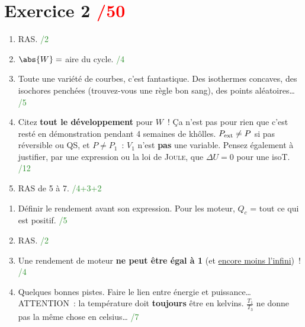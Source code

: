 \documentclass[a4paper, 11pt, final, garamond]{book}
\begin{document}
\section{Exercice 2 \hfill \textcolor{red}{/50}}
\begin{enumerate}
	\item RAS.
	      \hfill \textcolor{ForestGreen}{/2}
	\item $\abs{W} =$ aire du cycle.
	      \hfill \textcolor{ForestGreen}{/4}
	\item Toute une variété de courbes, c'est fantastique. Des isothermes
	      concaves, des isochores penchées (trouvez-vous une règle bon sang), des
	      points aléatoires…
	      \hfill \textcolor{ForestGreen}{/5}
	\item Citez \textbf{tout le développement} pour $W$~! Ça n'est pas pour rien
	      que c'est resté en démonstration pendant 4 semaines de khôlles. $P_{\rm ext}
		      \neq P$ si pas réversible ou QS, et $P \neq P_1$~: $V_1$ n'est \textbf{pas}
	      une variable. Pensez également à justifier, par une expression ou la loi de
	      \textsc{Joule}, que $\Delta{U} = 0$ pour une isoT.
	      \hfill \textcolor{ForestGreen}{/12}
	\item RAS de 5 à 7.
	      \hfill \textcolor{ForestGreen}{/4+3+2}
\end{enumerate}
\begin{enumerate}[start=8]
	\item Définir le rendement avant son expression. Pour les moteur, $Q_c$ = tout
	      ce qui est positif.
	      \hfill \textcolor{ForestGreen}{/5}
	\item RAS.
	      \hfill \textcolor{ForestGreen}{/2}
	\item Une rendement de moteur \textbf{ne peut être égal à 1} (et \ul{encore
		      moins l'infini})~!
	      \hfill \textcolor{ForestGreen}{/4}
	\item Quelques bonnes pistes. Faire le lien entre énergie et puissance…
	      ATTENTION~: la température doit \textbf{toujours} être en kelvins.
	      $\frac{T_1}{T_3}$ ne donne pas la même chose en celsius… \hfill
	      \textcolor{ForestGreen}{/7}
\end{enumerate}
\end{document}
